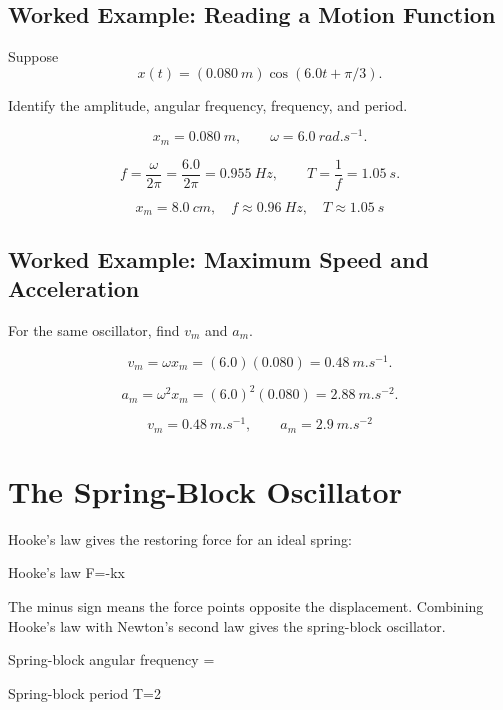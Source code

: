 \documentclass{studentnotes}
\begin{document}
\subsection{Worked Example: Reading a Motion Function}

Suppose
\[
    x(t)=(\SI{0.080}{m})\cos(6.0t+\pi/3).
\]

Identify the amplitude, angular frequency, frequency, and period.

\[
    x_m=\SI{0.080}{m},
    \qquad
    \omega=\SI{6.0}{rad.s^{-1}}.
\]

\[
    f=\frac{\omega}{2\pi}
      =\frac{6.0}{2\pi}
      =\SI{0.955}{Hz},
    \qquad
    T=\frac{1}{f}=\SI{1.05}{s}.
\]

\[
    \boxed{x_m=\SI{8.0}{cm},\quad f\approx\SI{0.96}{Hz},\quad T\approx\SI{1.05}{s}}
\]

\subsection{Worked Example: Maximum Speed and Acceleration}

For the same oscillator, find \(v_m\) and \(a_m\).

\[
    v_m=\omega x_m=(6.0)(0.080)=\SI{0.48}{m.s^{-1}}.
\]

\[
    a_m=\omega^2x_m=(6.0)^2(0.080)=\SI{2.88}{m.s^{-2}}.
\]

\[
    \boxed{v_m=\SI{0.48}{m.s^{-1}},\qquad a_m=\SI{2.9}{m.s^{-2}}}
\]

\section{The Spring-Block Oscillator}

Hooke's law gives the restoring force for an ideal spring:

\begin{namedformula}{Hooke's law}
    F=-kx
\end{namedformula}

The minus sign means the force points opposite the displacement. Combining
Hooke's law with Newton's second law gives the spring-block oscillator.

\begin{namedformula}{Spring-block angular frequency}
    \omega=
\end{namedformula}

\begin{namedformula}{Spring-block period}
    T=2\pi{}
\end{namedformula}
\end{document}
